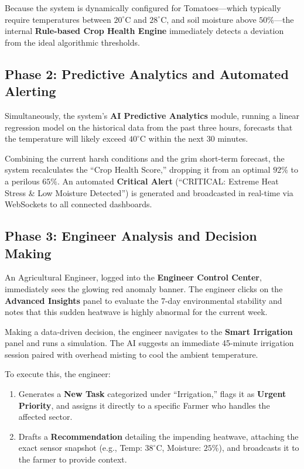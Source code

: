 \documentclass[12pt,a4paper]{article}
\begin{document}
Because the system is dynamically configured for Tomatoes—which typically require temperatures between $20^\circ$C and $28^\circ$C, and soil moisture above $50\%$—the internal \textbf{Rule-based Crop Health Engine} immediately detects a deviation from the ideal algorithmic thresholds. 

\subsection{Phase 2: Predictive Analytics and Automated Alerting}
Simultaneously, the system's \textbf{AI Predictive Analytics} module, running a linear regression model on the historical data from the past three hours, forecasts that the temperature will likely exceed $40^\circ$C within the next 30 minutes. 

Combining the current harsh conditions and the grim short-term forecast, the system recalculates the ``Crop Health Score,'' dropping it from an optimal $92\%$ to a perilous $65\%$. An automated \textbf{Critical Alert} (``CRITICAL: Extreme Heat Stress \& Low Moisture Detected'') is generated and broadcasted in real-time via WebSockets to all connected dashboards.

\subsection{Phase 3: Engineer Analysis and Decision Making}
An Agricultural Engineer, logged into the \textbf{Engineer Control Center}, immediately sees the glowing red anomaly banner. The engineer clicks on the \textbf{Advanced Insights} panel to evaluate the 7-day environmental stability and notes that this sudden heatwave is highly abnormal for the current week.

Making a data-driven decision, the engineer navigates to the \textbf{Smart Irrigation} panel and runs a simulation. The AI suggests an immediate 45-minute irrigation session paired with overhead misting to cool the ambient temperature. 

To execute this, the engineer:
\begin{enumerate}
    \item Generates a \textbf{New Task} categorized under ``Irrigation,'' flags it as \textbf{Urgent Priority}, and assigns it directly to a specific Farmer who handles the affected sector.
    \item Drafts a \textbf{Recommendation} detailing the impending heatwave, attaching the exact sensor snapshot (e.g., Temp: $38^\circ$C, Moisture: $25\%$), and broadcasts it to the farmer to provide context.
\end{enumerate}
\end{document}
